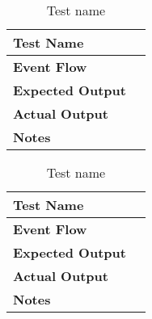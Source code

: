 \begin{table}[h]	
\centering
\def\arraystretch{1.5}
\begin{tabular}{|m{7cm}|m{7cm}|}
	\hline
	\textbf{Test Name}            &    \\ \hline
	\textbf{Event Flow}             &   \\ \hline
	\textbf{Expected Output}  &     \\ \hline
	\textbf{Actual Output}       &     \\ \hline
	\textbf{Notes} & \\ \hline
\end{tabular}
\caption{Test name}
\end{table}


\begin{table}[h]	
\centering
\def\arraystretch{1.5}
\begin{tabular}{|m{7cm}|m{7cm}|}
	\hline
	\textbf{Test Name}            &    \\ \hline
	\textbf{Event Flow}             &   \\ \hline
	\textbf{Expected Output}  &     \\ \hline
	\textbf{Actual Output}       &     \\ \hline
	\textbf{Notes} & \\ \hline
\end{tabular}
\caption{Test name}
\end{table}